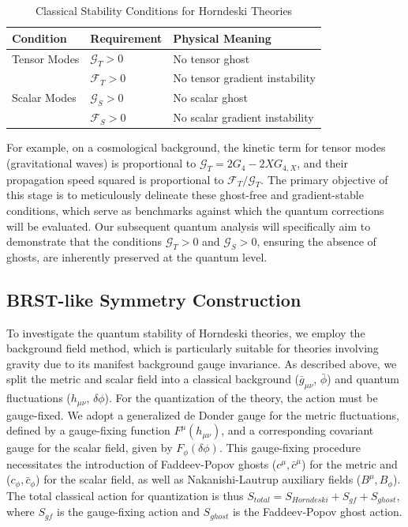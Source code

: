 \documentclass[twocolumn]{aastex631}
\begin{document}
\begin{table}[h!]
\centering
\caption{Classical Stability Conditions for Horndeski Theories}
\begin{tabular}{l l l}
\hline
\textbf{Condition} & \textbf{Requirement} & \textbf{Physical Meaning} \\
\hline
Tensor Modes & $\mathcal{G}_T > 0$ & No tensor ghost \\
& $\mathcal{F}_T > 0$ & No tensor gradient instability \\
Scalar Modes & $\mathcal{G}_S > 0$ & No scalar ghost \\
& $\mathcal{F}_S > 0$ & No scalar gradient instability \\
\hline
\end{tabular}
\end{table}

For example, on a cosmological background, the kinetic term for tensor modes (gravitational waves) is proportional to $\mathcal{G}_T = 2G_4 - 2X G_{4,X}$, and their propagation speed squared is proportional to $\mathcal{F}_T / \mathcal{G}_T$. The primary objective of this stage is to meticulously delineate these ghost-free and gradient-stable conditions, which serve as benchmarks against which the quantum corrections will be evaluated. Our subsequent quantum analysis will specifically aim to demonstrate that the conditions $\mathcal{G}_T > 0$ and $\mathcal{G}_S > 0$, ensuring the absence of ghosts, are inherently preserved at the quantum level.

\subsection{BRST-like Symmetry Construction}

To investigate the quantum stability of Horndeski theories, we employ the background field method, which is particularly suitable for theories involving gravity due to its manifest background gauge invariance. As described above, we split the metric and scalar field into a classical background ($\bar{g}_{\mu\nu}$, $\bar{\phi}$) and quantum fluctuations ($h_{\mu\nu}$, $\delta\phi$).
For the quantization of the theory, the action must be gauge-fixed. We adopt a generalized de Donder gauge for the metric fluctuations, defined by a gauge-fixing function $F^\mu(h_{\mu\nu})$, and a corresponding covariant gauge for the scalar field, given by $F_\phi(\delta\phi)$. This gauge-fixing procedure necessitates the introduction of Faddeev-Popov ghosts ($c^\mu, \bar{c}^\mu$) for the metric and ($c_\phi, \bar{c}_\phi$) for the scalar field, as well as Nakanishi-Lautrup auxiliary fields ($B^\mu, B_\phi$). The total classical action for quantization is thus $S_{total} = S_{Horndeski} + S_{gf} + S_{ghost}$, where $S_{gf}$ is the gauge-fixing action and $S_{ghost}$ is the Faddeev-Popov ghost action.
\end{document}
